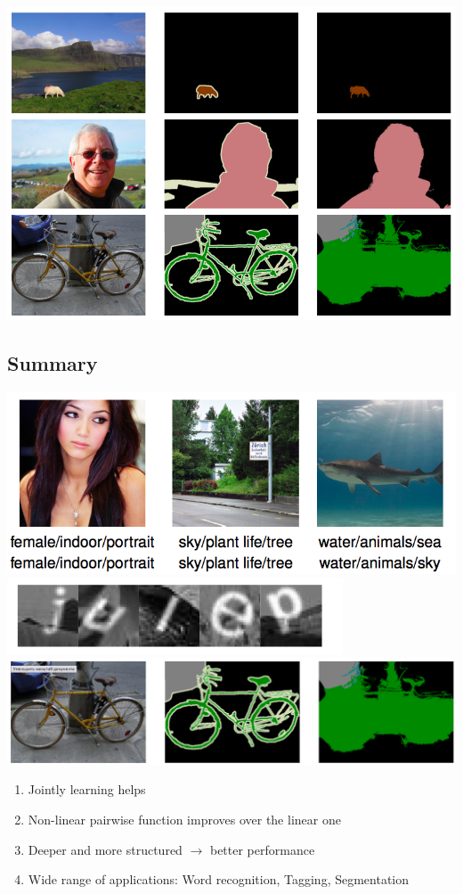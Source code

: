 \documentclass{beamer}
\begin{document}
	\begin{frame}
		\centering\includegraphics[scale=0.37]{img/ex3_2}
	\end{frame}
					
\subsection*{Summary}

\begin{frame}
		\includegraphics[scale=0.1]{img/flicker1}
		\includegraphics[scale=0.38]{img/words_11}
		\includegraphics[scale=0.1]{img/ex3_4}
		\bigskip
		\begin{enumerate}
			\item Jointly learning helps
			\item Non-linear pairwise function improves over the linear one
			\item Deeper and more structured $\rightarrow$ better performance
			\item Wide range of applications: Word recognition, Tagging, Segmentation
		\end{enumerate}
\end{frame}
\end{document}
